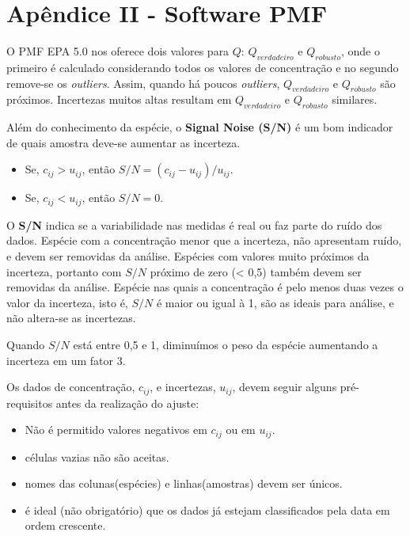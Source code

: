 \section{Apêndice II - Software PMF}

O PMF EPA 5.0 nos oferece dois valores 
para $Q$: $Q_{verdadeiro}$ e 
$Q_{robusto}$, onde o primeiro é calculado considerando todos os valores 
de concentração e no segundo remove-se os \textit{outliers}.
Assim, quando há poucos \textit{outliers}, $Q_{verdadeiro}$ e $Q_{robusto}$ 
são próximos. Incertezas muitos altas resultam em $Q_{verdadeiro}$ e 
$Q_{robusto}$ similares.

Além do conhecimento da espécie, o \textbf{Signal Noise (S/N)} é um bom 
indicador de quais amostra deve-se aumentar as incerteza.

\begin{itemize}
  \item Se, $c_{ij} >  u_{ij}$, então $ S/N = (c_{ij} - u_{ij})/u_{ij}$.
  \item Se, $c_{ij} <  u_{ij}$, então $S/N = 0 $.
\end{itemize}

O \textbf{S/N} indica se a variabilidade nas medidas é real ou faz parte do 
ruído dos dados. 
Espécie com a concentração menor que a incerteza, não apresentam ruído, e devem 
ser removidas da análise. Espécies com valores muito próximos da incerteza, 
portanto com $S/N$ próximo de zero (< 0,5) também devem ser removidas da 
análise. 
Espécie nas quais a concentração é pelo menos duas vezes o valor da incerteza, 
isto é, $S/N$ é maior ou igual à 1, são as ideais para análise, 
e não altera-se as incertezas. 

Quando $S/N$ está entre 0,5 e 1, diminuímos o peso da espécie aumentando a 
incerteza em um fator 3.  

Os dados de concentração, $c_{ij}$, e incertezas, $u_{ij}$, devem seguir 
alguns pré-requisitos antes da realização do ajuste:

\begin{itemize}
  \item Não é permitido valores negativos em $c_{ij}$ ou em $u_{ij}$.
  \item células vazias não são aceitas.
  \item nomes das colunas(espécies) e linhas(amostras) devem ser únicos.
  \item é ideal (não obrigatório) que os dados já estejam classificados 
        pela data em ordem crescente.
\end{itemize}

